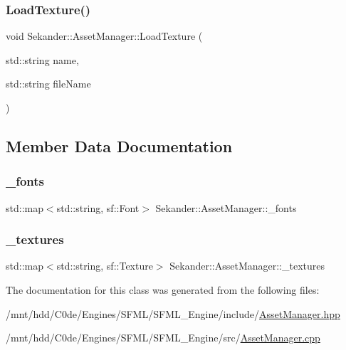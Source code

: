 \mbox{\label{classSekander_1_1AssetManager_a49871c9808fc5e2988059c92fb181c67}} 
\subsubsection{\texorpdfstring{Load\+Texture()}{LoadTexture()}}
{\footnotesize\ttfamily void Sekander\+::\+Asset\+Manager\+::\+Load\+Texture (\begin{DoxyParamCaption}\item[{std\+::string}]{name,  }\item[{std\+::string}]{file\+Name }\end{DoxyParamCaption})}



\subsection{Member Data Documentation}
\mbox{\label{classSekander_1_1AssetManager_ab9f59df9ccf2272cde52a93690cad9b7}} 
\subsubsection{\texorpdfstring{\+\_\+fonts}{\_fonts}}
{\footnotesize\ttfamily std\+::map$<$std\+::string, sf\+::\+Font$>$ Sekander\+::\+Asset\+Manager\+::\+\_\+fonts\hspace{0.3cm}{\ttfamily [private]}}

\mbox{\label{classSekander_1_1AssetManager_a8c48606112891dce7f97438ecb5d78cb}} 
\subsubsection{\texorpdfstring{\+\_\+textures}{\_textures}}
{\footnotesize\ttfamily std\+::map$<$std\+::string, sf\+::\+Texture$>$ Sekander\+::\+Asset\+Manager\+::\+\_\+textures\hspace{0.3cm}{\ttfamily [private]}}



The documentation for this class was generated from the following files\+:\begin{DoxyCompactItemize}
\item 
/mnt/hdd/\+C0de/\+Engines/\+S\+F\+M\+L/\+S\+F\+M\+L\+\_\+\+Engine/include/\hyperlink{AssetManager_8hpp}{Asset\+Manager.\+hpp}\item 
/mnt/hdd/\+C0de/\+Engines/\+S\+F\+M\+L/\+S\+F\+M\+L\+\_\+\+Engine/src/\hyperlink{AssetManager_8cpp}{Asset\+Manager.\+cpp}\end{DoxyCompactItemize}
